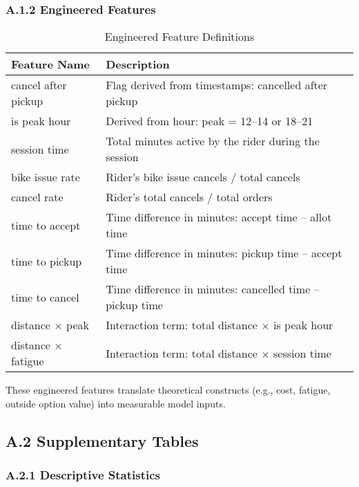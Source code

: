 \documentclass[12pt,letterpaper]{article}
\begin{document}
\subsubsection*{A.1.2 Engineered Features}

\begin{table}[H]
\centering
\caption{Engineered Feature Definitions}
\label{tab:engineered_features}
\begin{tabular}{p{4.2cm} p{10.3cm}}
\toprule
\textbf{Feature Name} & \textbf{Description} \\
\midrule
cancel after pickup & Flag derived from timestamps: cancelled after pickup \\
is peak hour & Derived from hour: peak = 12--14 or 18--21 \\
session time & Total minutes active by the rider during the session \\
bike issue rate & Rider's bike issue cancels / total cancels \\
cancel rate & Rider's total cancels / total orders \\
time to accept & Time difference in minutes: accept time -- allot time \\
time to pickup & Time difference in minutes: pickup time -- accept time \\
time to cancel & Time difference in minutes: cancelled time -- pickup time \\
distance $\times$ peak & Interaction term: total distance $\times$ is peak hour \\
distance $\times$ fatigue & Interaction term: total distance $\times$ session time \\
\bottomrule
\end{tabular}
\end{table}

These engineered features translate theoretical constructs (e.g., cost, fatigue, outside option value) into measurable model inputs.

\subsection*{A.2 Supplementary Tables}
\subsubsection*{A.2.1 Descriptive Statistics}
\end{document}
